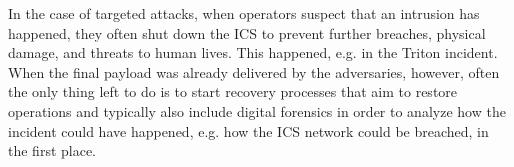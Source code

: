 \documentclass[runningheads]{llncs}
\begin{document}
In the case of targeted attacks, when operators suspect that an intrusion has happened, they often shut down the ICS to prevent further breaches, physical damage, and threats to human lives.
This happened, e.g. in the Triton incident.
When the final payload was already delivered by the adversaries, however, often the only thing left to do is to start recovery processes that aim to restore operations and typically also include digital forensics in order to analyze how the incident could have happened, e.g. how the ICS network could be breached, in the first place.
\end{document}
